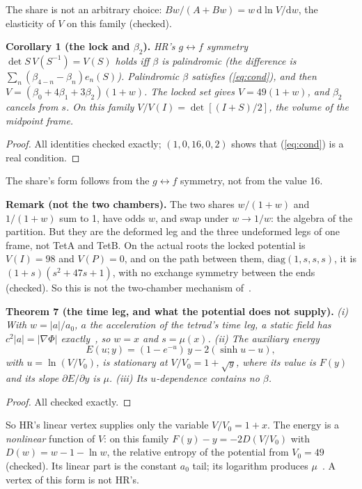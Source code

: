 \documentclass[twocolumn]{iopjournal}
\begin{document}
The share is not an arbitrary choice: $Bw/(A+Bw) = w\,\mathrm d\ln
V/\mathrm dw$, the elasticity of $V$ on this family (checked).

\textbf{Corollary 1 (the lock and $\beta_2$).} \emph{HR's $g\leftrightarrow f$ symmetry
$\det S\,V(S^{-1}) = V(S)$ holds iff $\beta$ is palindromic (the
difference is $\sum_n(\beta_{4-n}-\beta_n)e_n(S)$). Palindromic $\beta$
satisfies (\ref{eq:cond}), and then
$V = (\beta_0 + 4\beta_1 + 3\beta_2)(1+w)$. The locked set gives
$V = 49(1+w)$, and $\beta_2$ cancels from $s$. On this family
$V/V(I) = \det[(I+S)/2]$, the volume of the midpoint frame.}

\begin{proof}
All identities checked exactly; $(1,0,16,0,2)$ shows that
(\ref{eq:cond}) is a real condition.
\end{proof}

The share's form follows from the $g\leftrightarrow f$ symmetry,
not from the value 16.

\textbf{Remark (not the two chambers).} The two shares $w/(1+w)$ and
$1/(1+w)$ sum to 1, have odds $w$, and swap under $w\to1/w$: the
algebra of the partition. But they are the deformed leg and the three
undeformed legs of one frame, not TetA and TetB. On the actual roots
the locked potential is $V(I) = 98$ and $V(P) = 0$, and on the path
between them, $\mathrm{diag}(1,s,s,s)$, it is $(1+s)(s^2+47s+1)$, with
no exchange symmetry between the ends (checked). So this is not the
two-chamber mechanism of~\cite{NelsonExch,NelsonL2}.

\textbf{Theorem 7 (the time leg, and what the potential does not
supply).} \emph{(i) With $w = |a|/a_0$, $a$ the acceleration of the
tetrad's time leg, a static field has $c^2|a| = |\nabla\Phi|$
exactly~\cite{NelsonTL}, so $w = x$ and $s = \mu(x)$. (ii) The
auxiliary energy
\[
E(u;y) = (1 - e^{-u})\,y - 2(\sinh u - u),
\]
with $u = \ln(V/V_0)$,
is stationary at $V/V_0 = 1 + \sqrt y$, where its value is $F(y)$ and
its slope $\partial E/\partial y$ is $\mu$. (iii) Its $u$-dependence
contains no $\beta$.}

\begin{proof}
All checked exactly.
\end{proof}

So HR's linear vertex supplies only the variable $V/V_0 = 1 + x$. The
energy is a \emph{nonlinear} function of $V$: on this family
$F(y) - y = -2D(V/V_0)$ with $D(w) = w - 1 - \ln w$, the relative entropy
of the potential from $V_0 = 49$ (checked). Its linear part is the
constant $a_0$ tail; its logarithm produces $\mu$~\cite{NelsonTwoConn}.
A vertex of this form is not HR's.
\end{document}
